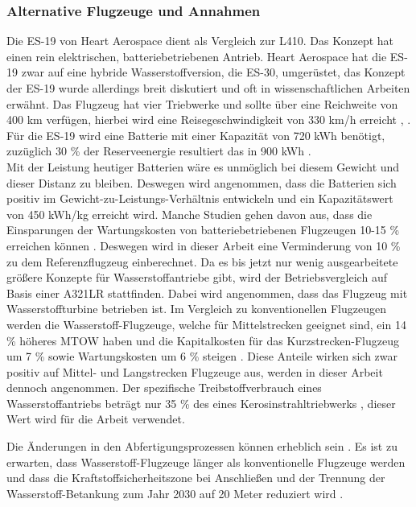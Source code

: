 \subsubsection{Alternative Flugzeuge und Annahmen}
Die ES-19 von Heart Aerospace dient als Vergleich zur L410. 
Das Konzept hat einen rein elektrischen, batteriebetriebenen Antrieb.
Heart Aerospace hat die ES-19 zwar auf eine hybride Wasserstoffversion, die ES-30, umgerüstet, 
das Konzept der ES-19 wurde allerdings breit diskutiert und oft in wissenschaftlichen Arbeiten erwähnt. 
Das Flugzeug hat vier Triebwerke und sollte über eine Reichweite von 400 km verfügen, 
hierbei wird eine Reisegeschwindigkeit von 330 km/h erreicht  \cite{anker2023feasibility}, \cite{heart_aerospace_es19}.
Für die ES-19 wird eine Batterie mit einer Kapazität von 720 kWh benötigt,
zuzüglich 30 \% der Reserveenergie resultiert das in 900 kWh \cite{donckers2024electric}. \\
Mit der Leistung heutiger Batterien wäre es unmöglich bei diesem Gewicht und dieser Distanz zu bleiben.
Deswegen wird angenommen, dass die Batterien sich positiv im Gewicht-zu-Leistungs-Verhältnis 
entwickeln und ein Kapazitätswert von 450 kWh/kg erreicht wird.
Manche Studien gehen davon aus, dass die Einsparungen der Wartungskosten 
von batteriebetriebenen Flugzeugen 10-15 \% erreichen können \cite{wangsness2021fremskyndet,avogadro2024demystifying}. 
Deswegen wird in dieser Arbeit eine Verminderung von 10 \% zu dem Referenzflugzeug einberechnet.
%
Da es bis jetzt nur wenig ausgearbeitete größere Konzepte für Wasserstoffantriebe gibt, 
wird der Betriebsvergleich auf Basis einer A321LR stattfinden. 
Dabei wird angenommen, dass das Flugzeug mit Wasserstoffturbine betrieben ist.
Im Vergleich zu konventionellen Flugzeugen werden die Wasserstoff-Flugzeuge, 
welche für Mittelstrecken geeignet sind, ein 14 \% höheres MTOW haben und die Kapitalkosten 
für das Kurzstrecken-Flugzeug um 7 \% sowie Wartungskosten um 6 \% steigen \cite{sky2020hydrogen}. 
Diese Anteile wirken sich zwar positiv auf Mittel- und Langstrecken Flugzeuge aus, 
werden in dieser Arbeit dennoch angenommen.
Der spezifische Treibstoffverbrauch eines Wasserstoffantriebs beträgt nur 35 \% 
des eines Kerosinstrahltriebwerks \cite{scholz2021parameterselection}, dieser Wert wird für die Arbeit verwendet.

Die Änderungen in den Abfertigungsprozessen können erheblich sein \cite{ati_hydrogen_infrastructure}. 
%
Es ist zu erwarten, dass Wasserstoff-Flugzeuge länger als konventionelle Flugzeuge werden
und dass die Kraftstoffsicherheitszone bei Anschließen und der Trennung 
der Wasserstoff-Betankung zum Jahr 2030 auf 20 Meter reduziert wird \cite{hoelzen2022h2}.

